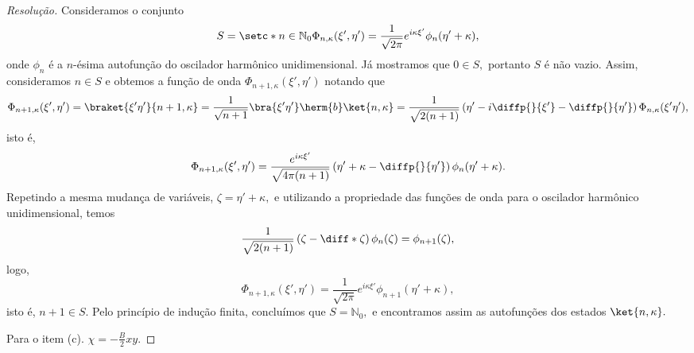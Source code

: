 \begin{proof}[Resolução]
   Consideramos o conjunto
   \begin{equation*}
      S = \setc*{n \in \mathbb{N}_0}{\Phi_{n, \kappa}(\xi', \eta') = \frac1{\sqrt{2\pi}} e^{i \kappa \xi'} \phi_n(\eta' + \kappa)},
   \end{equation*}
   onde \(\phi_n\) é a \(n\)-ésima autofunção do oscilador harmônico unidimensional. Já mostramos que \(0 \in S,\) portanto \(S\) é não vazio. Assim, consideramos \(n \in S\) e obtemos a função de onda \(\Phi_{n+1,\kappa}(\xi', \eta')\) notando que
   \begin{equation*}
      \Phi_{n+1,\kappa}(\xi', \eta') = \braket{\xi'\eta'}{n+1,\kappa} = \frac{1}{\sqrt{n+1}} \bra{\xi'\eta'} \herm{b}\ket{n,\kappa} = \frac{1}{\sqrt{2(n+1)}} \left(\eta' - i \diffp{}{\xi'} - \diffp{}{\eta'}\right)\Phi_{n,\kappa}(\xi'\eta'),
   \end{equation*}
   isto é,
   \begin{equation*}
      \Phi_{n+1,\kappa}(\xi', \eta') = \frac{e^{i\kappa \xi'}}{\sqrt{4\pi(n+1)}} \left(\eta' + \kappa - \diffp{}{\eta'}\right)\phi_n(\eta' + \kappa).
   \end{equation*}
   Repetindo a mesma mudança de variáveis, \(\zeta = \eta' + \kappa,\) e utilizando a propriedade das funções de onda para o oscilador harmônico unidimensional, temos
   \begin{equation*}
      \frac{1}{\sqrt{2(n+1)}} \left(\zeta - \diff*{}{\zeta}\right)\phi_n(\zeta) = \phi_{n+1}(\zeta),
   \end{equation*}
   logo,
   \begin{equation*}
      \Phi_{n+1,\kappa}(\xi', \eta') = \frac{1}{\sqrt{2\pi}} e^{i \kappa \xi'} \phi_{n+1}(\eta' + \kappa),
   \end{equation*}
   isto é, \(n + 1 \in S.\) Pelo princípio de indução finita, concluímos que \(S = \mathbb{N}_0,\) e encontramos assim as autofunções dos estados \(\ket{n,\kappa}.\)


   Para o item (c). \(\chi = - \frac{B}2 xy.\)
\end{proof}
